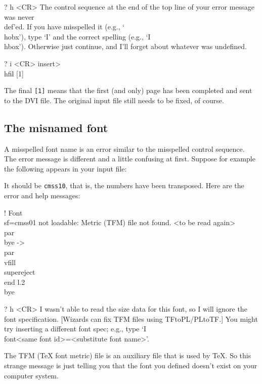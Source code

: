  
\beginuser 
? h <CR> 
The control sequence at the end of the top line 
of your error message was never \\def'ed. If you have 
misspelled it (e.g., `\\hobx'), type `I' and the correct 
spelling (e.g., `I\\hbox'). Otherwise just continue, 
and I'll forget about whatever was undefined. 
 
? i <CR> 
insert>\\hfil 
[1] 
\enduser 
 
The final {\tt [1]} means that the first (and only) page has 
been completed and sent to the DVI file.  The original input file 
still needs to be fixed, of course. 
 
\subsection{The misnamed font} 
 
A misspelled font name is an error similar to the misspelled 
control sequence.  The error message is different and a little 
confusing at first. Suppose for example the following appears in 
your input file: 
 
 
It should be {\tt cmss10}, that is, the numbers have been 
transposed.  Here are the error and help messages: 
 
\beginuser \obeyspaces 
! Font \\sf=cmss01 not loadable: Metric (TFM) file not found. 
<to be read again> 
\                   \\par 
\\bye ->\\par 
\            \\vfill \\supereject \\end 
l.2 \\bye 
 
? h <CR> 
I wasn't able to read the size data for this font, 
so I will ignore the font specification. 
[Wizards can fix TFM files using TFtoPL/PLtoTF.] 
You might try inserting a different font spec; 
e.g., type `I\\font<same font id>=<substitute font name>'. 
\enduser 
 
The TFM (\TeX{} font metric) file is an auxiliary file that is 
used by \TeX\null. So this strange message is just telling you 
that the font you defined doesn't exist on your computer system. 
 
